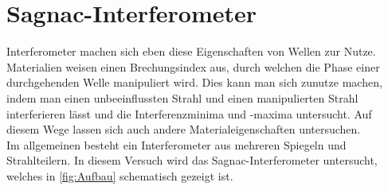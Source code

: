 \section{Sagnac-Interferometer}
\label{sec:Sagnac}

Interferometer machen sich eben diese Eigenschaften von Wellen zur Nutze. Materialien weisen einen Brechungsindex aus, durch
welchen die Phase einer durchgehenden Welle manipuliert wird. Dies kann man sich zunutze machen, indem man einen unbeeinflussten Strahl und
einen manipulierten Strahl interferieren lässt und die Interferenzminima und -maxima untersucht. Auf diesem Wege lassen sich auch 
andere Materialeigenschaften untersuchen.\\
Im allgemeinen besteht ein Interferometer aus mehreren Spiegeln und Strahlteilern. In diesem Versuch wird das Sagnac-Interferometer untersucht,
welches in \autoref{fig:Aufbau} schematisch gezeigt ist.\\

